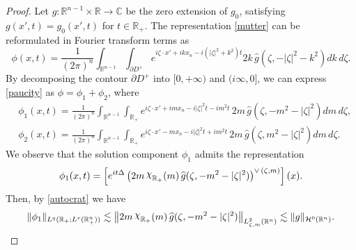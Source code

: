 \documentclass[preprint,compress,12pt]{elsarticle}
\numberwithin{equation}{section}
\begin{document}
\begin{proof}
	Let $g:\mathbb{R}^{n-1} \times\mathbb{R}\rightarrow \mathbb{C}$ be the zero extension of $g_0$, satisfying  $g(x',t)=g_{0}(x',t)$ for $t\in\mathbb{R}_{+}$. The representation \eqref{mutter} can be reformulated in Fourier transform terms as
	\begin{equation}\label{paucity}
		\phi(x,t)=\frac{1}{(2\pi)^{n}}\int_{\mathbb{R}^{n-1}}\int_{\partial D^{+}}e^{i\zeta\cdot x'+ikx_{n}-i(|\zeta|^{2}+k^{2})t}2k\, \widehat{g}\left(\zeta,-|\zeta|^{2}-k^{2}\right)dk\,d\zeta.
	\end{equation}
	By decomposing the contour $\partial D^{+}$ into $[0,+\infty)$ and $(i\infty,0]$, we can express \eqref{paucity} as $\phi=\phi_{1}+\phi_{2}$, where
	\begin{align}	&\phi_{1}(x,t)=\frac{1}{(2\pi)^{n}}\int_{\mathbb{R}^{n-1}}\int_{\mathbb{R}_{+}}e^{i\zeta\cdot x'+imx_{n}-i|\zeta|^{2}t-im^{2}t}\, 2m \, \widehat{g}(\zeta,-m^{2}-|\zeta|^{2})dm\, d\zeta,\label{q1}\\ &\phi_{2}(x,t)=\frac{1}{(2\pi)^{n}}\int_{\mathbb{R}^{n-1}}\int_{\mathbb{R}_{+}}e^{i\zeta\cdot x'-mx_{n}-i|\zeta|^{2}t+im^{2}t} \,2m\,\widehat{g}(\zeta,m^{2}-|\zeta|^{2}) dm\,d\zeta.\label{overwhelm}
	\end{align}
	We observe that the solution component $\phi_{1}$ admits the representation
	\begin{equation}\label{trestle}
		\phi_{1}(x,t)= \left[e^{it\Delta}\left(2m \, \raisebox{0.5ex}{$\chi$}_{\mathbb{R}_{+}}(m) \,\widehat{g}(\zeta ,-m^{2}-|\zeta|^{2})\right)^{\vee\,(\zeta,m)}\right](x).
	\end{equation}
	Then, by \eqref{autocrat} we have
	\begin{equation} \label{ahdi} \|\phi_{1}\|_{L^{q}(\mathbb{R}_{+};L^{r}(\mathbb{R}^{n}_{+}))}\lesssim\left\|2m\, \raisebox{0.5ex}{$\chi$}_{\mathbb{R}_{+}}(m)\, \widehat{g}(\zeta ,-m^{2}-|\zeta|^{2})\right\|_{L^{2}_{\zeta,m}(\mathbb{R}^{n})}\lesssim \|g\|_{\mathcal{H}^{0}(\mathbb{R}^{n})}.
	\end{equation}
	

\end{proof}
\end{document}
